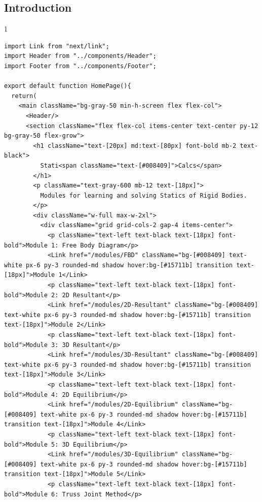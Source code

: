 \subsection*{Introduction}
\begin{spacing}{1}
\begin{Verbatim}[breaklines=true, breaksymbolleft={}, breaksymbolright={}]
import Link from "next/link";
import Header from "../components/Header";
import Footer from "../components/Footer";

export default function HomePage(){
  return(
    <main className="bg-gray-50 min-h-screen flex flex-col">
      <Header/>
      <section className="flex flex-col items-center text-center py-12 bg-gray-50 flex-grow">
        <h1 className="text-[20px] md:text-[80px] font-bold mb-2 text-black">
          Stati<span className="text-[#008409]">Calcs</span>
        </h1>
        <p className="text-gray-600 mb-12 text-[18px]">
          Modules for learning and solving Statics of Rigid Bodies.
        </p>
        <div className="w-full max-w-2xl">
          <div className="grid grid-cols-2 gap-4 items-center">
            <p className="text-left text-black text-[18px] font-bold">Module 1: Free Body Diagram</p>
            <Link href="/modules/FBD" className="bg-[#008409] text-white px-6 py-3 rounded-md shadow hover:bg-[#15711b] transition text-[18px]">Module 1</Link>
            <p className="text-left text-black text-[18px] font-bold">Module 2: 2D Resultant</p>
            <Link href="/modules/2D-Resultant" className="bg-[#008409] text-white px-6 py-3 rounded-md shadow hover:bg-[#15711b] transition text-[18px]">Module 2</Link>
            <p className="text-left text-black text-[18px] font-bold">Module 3: 3D Resultant</p>
            <Link href="/modules/3D-Resultant" className="bg-[#008409] text-white px-6 py-3 rounded-md shadow hover:bg-[#15711b] transition text-[18px]">Module 3</Link>
            <p className="text-left text-black text-[18px] font-bold">Module 4: 2D Equilibrium</p>
            <Link href="/modules/2D-Equilibrium" className="bg-[#008409] text-white px-6 py-3 rounded-md shadow hover:bg-[#15711b] transition text-[18px]">Module 4</Link>
            <p className="text-left text-black text-[18px] font-bold">Module 5: 3D Equilibrium</p>
            <Link href="/modules/3D-Equilibrium" className="bg-[#008409] text-white px-6 py-3 rounded-md shadow hover:bg-[#15711b] transition text-[18px]">Module 5</Link>
            <p className="text-left text-black text-[18px] font-bold">Module 6: Truss Joint Method</p>

\end{Verbatim}
\end{spacing}
